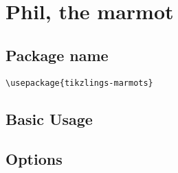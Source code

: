 \documentclass[parskip=half]{scrartcl}
\begin{document}

\clearpage
\section[\textbackslash marmot]{Phil, the marmot}

\subsection{Package name}

\begin{tcolorbox}
\vspace*{0.5cm}
\lstinline|\usepackage{tikzlings-marmots}|
\vspace*{0.5cm}
\end{tcolorbox}

\subsection{Basic Usage}

\begin{tcblisting}{}
\marmot
\end{tcblisting}

\subsection{Options}

\begin{tcblisting}{}
\marmot[body=SteelBlue]
\end{tcblisting}

\begin{tcblisting}{}
\marmot[blush]
\end{tcblisting}

\begin{tcblisting}{}
\marmot[whiskers=gray]
\end{tcblisting}

\begin{tcblisting}{}
\marmot[teeth]
\end{tcblisting}

\begin{tcblisting}{}
\marmot[shadow]
\end{tcblisting}

\begin{tcblisting}{}
\marmot[askphil]
\end{tcblisting}

\begin{tcblisting}{}
\marmot[leftstep]
\end{tcblisting}
\end{document}

